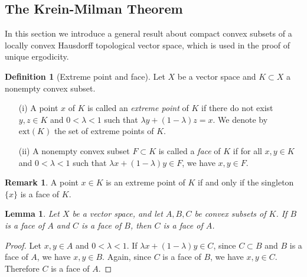 \documentclass{article}
\numberwithin{equation}{section}
\theoremstyle{plain}
\newtheorem{lemma}[theorem]{Lemma}
\theoremstyle{definition}
\newtheorem{definition}[theorem]{Definition}
\newtheorem*{remark}{Remark}
\begin{document}
\subsection{The Krein-Milman Theorem}
In this section we introduce a general result about compact
convex subsets of a locally convex Hausdorff topological vector space, which is used in the proof of unique ergodicity. 
\begin{definition}[Extreme point and face]
	Let $X$ be a vector space and $K\subset X$ a nonempty convex subset. 
	\begin{itemize}
		\item[(i)] A point $x$ of $K$ is called an \textit{extreme point} of $K$ if there do not exist $y,z\in K$ and $0<\lambda<1$ such that $\lambda y+(1-\lambda)z=x$. We denote by $\mathrm{ext}(K)$ the set of extreme points of $K$.
		\item[(ii)] A nonempty convex subset $F\subset K$ is called a \textit{face} of $K$ if for all $x,y\in K$ and $0<\lambda<1$ such that $\lambda x+(1-\lambda)y\in F$, we have $x,y\in F$.
	\end{itemize} 
	\begin{remark}
		A point $x\in K$ is an extreme point of $K$ if and only if the singleton $\{x\}$ is a face of $K$.
	\end{remark}
\end{definition}

\begin{lemma}\label{kmlemma1}
	Let $X$ be a vector space, and let $A,B,C$ be convex subsets of $K$. If $B$ is a face of $A$ and $C$ is a face of $B$, then $C$ is a face of $A$.
\end{lemma}
\begin{proof}
	Let $x,y\in A$ and $0<\lambda<1$. If $\lambda x+(1-\lambda)y\in C$, since $C\subset B$ and $B$ is a face of $A$, we have $x,y\in B$. Again, since $C$ is a face of $B$, we have $x,y\in C$. Therefore $C$ is a face of $A$.
\end{proof}
\end{document}
